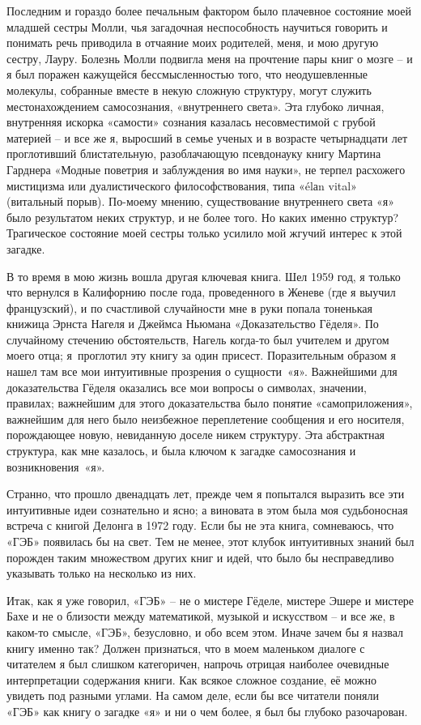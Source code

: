 \documentclass[../main.tex]{subfiles}
\begin{document}
Последним и гораздо более печальным фактором было плачевное состояние моей младшей сестры Молли, чья загадочная неспособность научиться говорить и понимать речь приводила в отчаяние моих родителей, меня, и мою другую сестру, Лауру. Болезнь Молли подвигла меня на прочтение пары книг о мозге \--- и я был поражен кажущейся бессмысленностью того, что неодушевленные молекулы, собранные вместе в некую сложную структуру, могут служить местонахождением самосознания, «внутреннего света». Эта глубоко личная, внутренняя искорка «самости» сознания казалась несовместимой с грубой материей \--- и все же я, выросший в семье ученых и в возрасте четырнадцати лет проглотивший блистательную, разоблачающую псевдонауку книгу Мартина Гарднера «Модные поветрия и заблуждения во имя науки», не терпел расхожего мистицизма или дуалистического философствования, типа «\'elаn vital» (витальный порыв). По-моему мнению, существование внутреннего света «я» было результатом неких структур, и не более того. Но каких именно структур? Трагическое состояние моей сестры только усилило мой жгучий интерес к этой загадке.

В то время в мою жизнь вошла другая ключевая книга. Шел 1959 год, я только что вернулся в Калифорнию после года, проведенного в Женеве (где я выучил французский), и по счастливой случайности мне в руки попала тоненькая книжица Эрнста Нагеля и Джеймса Ньюмана «Доказательство Гёделя». По случайному стечению обстоятельств, Нагель когда-то был учителем и другом моего отца; я~проглотил эту книгу за один присест. Поразительным образом я нашел там все мои интуитивные прозрения о сущности~«я». Важнейшими для доказательства Гёделя оказались все мои вопросы о символах, значении, правилах; важнейшим для этого доказательства было понятие «самоприложения», важнейшим для него было неизбежное переплетение сообщения и его носителя, порождающее новую, невиданную доселе никем структуру. Эта абстрактная структура, как мне казалось, и была ключом к загадке самосознания и возникновения~«я».

Странно, что прошло двенадцать лет, прежде чем я попытался выразить все эти интуитивные идеи сознательно и ясно; а виновата в этом была моя судьбоносная встреча с книгой Делонга в 1972 году. Если бы не эта книга, сомневаюсь, что «ГЭБ» появилась бы на свет. Тем не менее, этот клубок интуитивных знаний был порожден таким множеством других книг и идей, что было бы несправедливо указывать только на несколько из них.

Итак, как я уже говорил, «ГЭБ» \--- не о мистере Гёделе, мистере Эшере и мистере Бахе и не о близости между математикой, музыкой и искусством \--- и все же, в каком-то смысле, «ГЭБ», безусловно, и обо всем этом. Иначе зачем бы я назвал книгу именно так? Должен признаться, что в моем маленьком диалоге с читателем я был слишком категоричен, напрочь отрицая наиболее очевидные интерпретации содержания книги. Как всякое сложное создание, её можно увидеть под разными углами. На самом деле, если бы все читатели поняли «ГЭБ» как книгу о загадке «я» и ни о чем более, я был бы глубоко разочарован.
\end{document}
